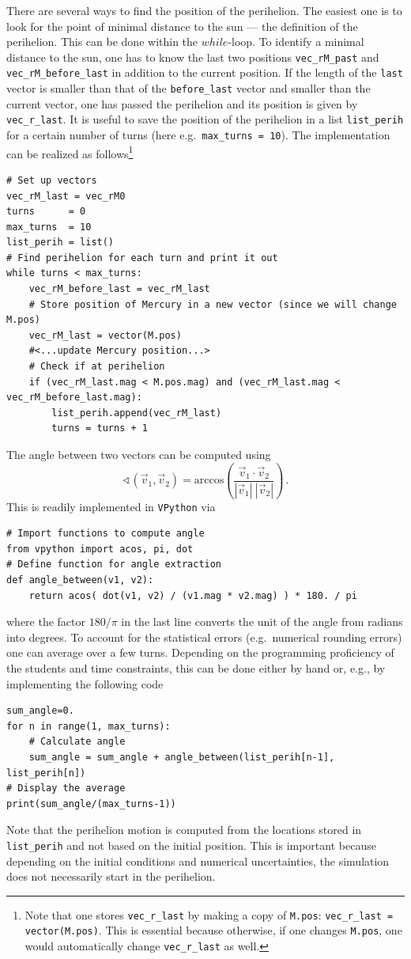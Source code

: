 \documentclass[12pt,ngerman,american]{iopart}
\newcommand{\code}[1]{{\scriptsize\colorbox{light-gray}{\texttt{#1}}}}
\begin{document}
There are several ways to find the position of the perihelion.
The easiest one is to look for the point of minimal distance to the sun --- the definition of the perihelion.
This can be done within the $while$-loop.
To identify a minimal distance to the sun, one has to know the last two positions \code{vec\_rM\_past} and \code{vec\_rM\_before\_last} in addition to the current position.
If the length of the \texttt{last} vector is smaller than that of the \texttt{before\_last} vector and smaller than the current vector, one has passed the perihelion and its position is given by \code{vec\_r\_last}.
It is useful to save the position of the perihelion in a list \code{list\_perih} for a certain number of turns (here e.g.\ \code{max\_turns = 10}).
The implementation can be realized as follows\footnote{%
	Note that one stores \code{vec\_r\_last} by making a copy of \code{M.pos}: \code{vec\_r\_last = vector(M.pos)}.
	This is essential because otherwise, if one changes \code{M.pos}, one would automatically change \code{vec\_r\_last} as well.
}
\begin{lstlisting}
# Set up vectors
vec_rM_last = vec_rM0
turns      = 0
max_turns  = 10
list_perih = list()
# Find perihelion for each turn and print it out
while turns < max_turns:
    vec_rM_before_last = vec_rM_last
    # Store position of Mercury in a new vector (since we will change M.pos)
    vec_rM_last = vector(M.pos)
    #<...update Mercury position...>
    # Check if at perihelion
    if (vec_rM_last.mag < M.pos.mag) and (vec_rM_last.mag < vec_rM_before_last.mag):
        list_perih.append(vec_rM_last)
        turns = turns + 1
\end{lstlisting}
The angle between two vectors can be computed using
 \begin{equation}
 	\sphericalangle(\vec{v}_{1},\vec{v}_2) = \mathrm{arccos} \left( \frac{\vec{v}_{1} \cdot \vec{v}_2}{|\vec{v}_{1}|\:|\vec{v}_2|} \right)
	\, .
 \end{equation}
This is readily implemented in \texttt{VPython} via
\begin{lstlisting}
# Import functions to compute angle
from vpython import acos, pi, dot
# Define function for angle extraction
def angle_between(v1, v2):
    return acos( dot(v1, v2) / (v1.mag * v2.mag) ) * 180. / pi
\end{lstlisting}
where the factor $180/\pi$ in the last line converts the unit of the angle from radians into degrees.
To account for the statistical errors (e.g.\ numerical rounding errors) one can average over a few turns.
Depending on the programming proficiency of the students and time constraints, this can be done either by hand or, e.g., by implementing the following code
\begin{lstlisting}
sum_angle=0.
for n in range(1, max_turns):
    # Calculate angle
    sum_angle = sum_angle + angle_between(list_perih[n-1], list_perih[n])
# Display the average
print(sum_angle/(max_turns-1))
\end{lstlisting}
Note that the perihelion motion is computed from the locations stored in \code{list\_perih} and not based on the initial position.
This is important because depending on the initial conditions and numerical uncertainties, the simulation does not necessarily start in the perihelion.
\end{document}
